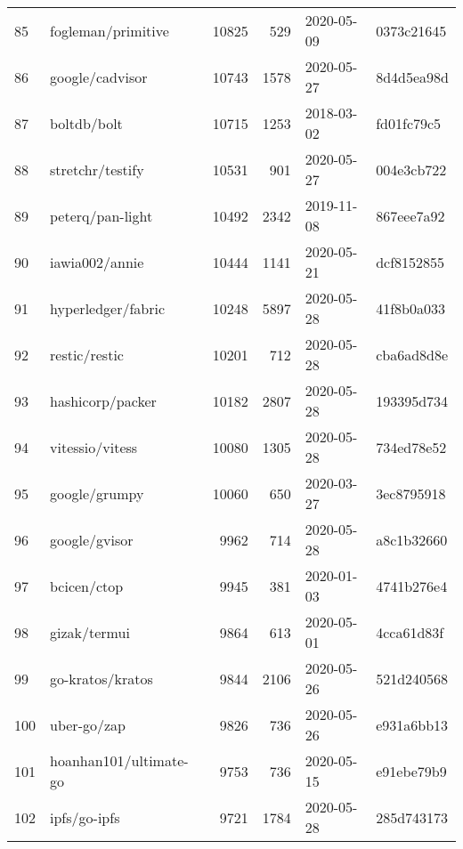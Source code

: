 \begin{longtable}{llrrll}
    85  &                                 fogleman/primitive &  10825 &    529 & 2020-05-09 &  0373c21645 \\
    86  &                                    google/cadvisor &  10743 &   1578 & 2020-05-27 &  8d4d5ea98d \\
    87  &                                        boltdb/bolt &  10715 &   1253 & 2018-03-02 &  fd01fc79c5 \\
    88  &                                   stretchr/testify &  10531 &    901 & 2020-05-27 &  004e3cb722 \\
    89  &                                   peterq/pan-light &  10492 &   2342 & 2019-11-08 &  867eee7a92 \\
    90  &                                     iawia002/annie &  10444 &   1141 & 2020-05-21 &  dcf8152855 \\
    91  &                                 hyperledger/fabric &  10248 &   5897 & 2020-05-28 &  41f8b0a033 \\
    92  &                                      restic/restic &  10201 &    712 & 2020-05-28 &  cba6ad8d8e \\
    93  &                                   hashicorp/packer &  10182 &   2807 & 2020-05-28 &  193395d734 \\
    94  &                                    vitessio/vitess &  10080 &   1305 & 2020-05-28 &  734ed78e52 \\
    95  &                                      google/grumpy &  10060 &    650 & 2020-03-27 &  3ec8795918 \\
    96  &                                      google/gvisor &   9962 &    714 & 2020-05-28 &  a8c1b32660 \\
    97  &                                        bcicen/ctop &   9945 &    381 & 2020-01-03 &  4741b276e4 \\
    98  &                                       gizak/termui &   9864 &    613 & 2020-05-01 &  4cca61d83f \\
    99  &                                   go-kratos/kratos &   9844 &   2106 & 2020-05-26 &  521d240568 \\
    100 &                                        uber-go/zap &   9826 &    736 & 2020-05-26 &  e931a6bb13 \\
    101 &                             hoanhan101/ultimate-go &   9753 &    736 & 2020-05-15 &  e91ebe79b9 \\
    102 &                                       ipfs/go-ipfs &   9721 &   1784 & 2020-05-28 &  285d743173 \\

\end{longtable}
